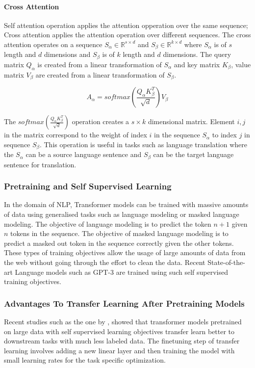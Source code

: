 \paragraph{Cross Attention}
\label{relatedwork:background:transformer:cross-attention}
Self attention operation applies the attention opperation over the same sequence; Cross attention applies the attention operation over different sequences. The cross attention operates on a sequence $S_\alpha \in \mathbb{R}^{s \times d}$ and $S_\beta \in \mathbb{R}^{k \times d}$ where $S_\alpha$ is of $s$ length and $d$ dimensions and $S_\beta$ is of $k$ length and $d$ dimensions. The query matrix $Q_\alpha$ is created from a linear transformation of $S_\alpha$ and key matrix $K_\beta$, value matrix $V_\beta$ are created from a linear transformation of $S_\beta$. 

$$A_\alpha=softmax(\frac{Q_{\alpha}K_{\beta}^{T}}{\sqrt{d}})V_{\beta}$$

The $softmax(\frac{Q_{\alpha}K_{\beta}^{T}}{\sqrt{d}})$ operation creates a $s \times k$ dimensional matrix. Element ${i,j}$ in the matrix correspond to the weight of index $i$ in the sequence $S_\alpha$ to index $j$ in sequence $S_\beta$. This operation is useful in tasks such as language translation where the $S_\alpha$ can be a source language sentence and $S_\beta$ can be the target language sentence for translation.  

\subsubsection{Pretraining and Self Supervised Learning}
In the domain of NLP, Transformer models can be trained with massive amounts of data using generalised tasks such as language modeling or masked language modeling. The objective of language modeling is to predict the token $n+1$ given $n$ tokens in the sequence. The objective of masked language modeling is to predict a masked out token in the sequence correctly given the other tokens. These types of training objectives allow the usage of large amounts of data from the web without going through the effort to clean the data. Recent State-of-the-art Language models such as GPT-3 \parencite{brown2020language} are trained using such self supervised training objectives. 

\subsubsection{Advantages To Transfer Learning After Pretraining Models}
Recent studies such as the one by \cite{hernandez2021scaling}, showed that transformer models pretrained on large data with self supervised learning objectives transfer learn better to downstream tasks with much less labeled data. The finetuning step\parencite{howard2018universal} of transfer learning involves adding a new linear layer and then training the model with small learning rates for the task specific optimization. 


